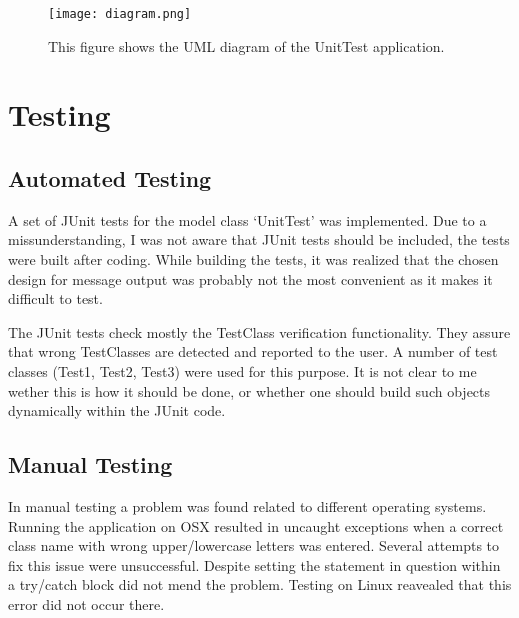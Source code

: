 \documentclass[a4paper,11pt,twoside]{article}
\begin{document}
\begin{figure}[p]
    \centering
    \texttt{[image: diagram.png]}
    \caption{This figure shows the UML diagram of the UnitTest application.}
    \label{fig:diagram}
\end{figure}


\section{Testing}

\subsection{Automated Testing}
A set of JUnit tests for the model class `UnitTest' was implemented. Due to a missunderstanding, I was not aware that JUnit tests should be included, the tests were built after coding. While building the tests, it was realized that the chosen design for message output was probably not the most convenient as it makes it difficult to test.

The JUnit tests check mostly the TestClass verification functionality. They assure that wrong TestClasses are detected and reported to the user. A number of test classes (Test1, Test2, Test3) were used for this purpose. It is not clear to me wether this is how it should be done, or whether one should build such objects dynamically within the JUnit code.

\subsection{Manual Testing}

In manual testing a problem was found related to different operating systems. Running the application on OSX resulted in uncaught exceptions when a correct class name with wrong upper/lowercase letters was entered. Several attempts to fix this issue were unsuccessful. Despite setting the statement in question within a try/catch block did not mend the problem. Testing on Linux reavealed that this error did not occur there.


\end{document}
